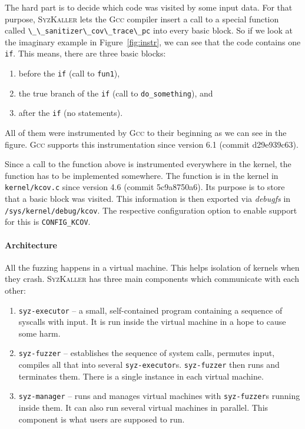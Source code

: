 \documentclass[10pt]{llncs}
\newcommand{\code}[2][]{\lstinline[columns=fullflexible, #1]$#2$}
\newcommand{\gcc}{\textsc{Gcc}\xspace}
\newcommand{\syz}{\textsc{SyzKaller}\xspace}
\begin{document}
The hard part is to decide which code was visited by some input data. For that
purpose, \syz lets the \gcc compiler insert a call to a special function
called \code{\_\_sanitizer\_cov\_trace\_pc} into every basic block.  So if we
look at the imaginary example in Figure~\ref{fig:instr}, we can see that the
code contains one \code{if}.  This means, there are three basic blocks:
\begin{enumerate}
  \item before the \code{if} (call to \code{fun1}),
  \item the true branch of the \code{if} (call to \code{do_something}), and
  \item after the \code{if} (no statements).
\end{enumerate}
All of them were instrumented by \gcc to their beginning as we can see in the
figure. \gcc supports this instrumentation since version 6.1 (commit
d29e939c63).

Since a call to the function above is instrumented everywhere in the kernel,
the function has to be implemented somewhere. The function is in the kernel in
\texttt{kernel/kcov.c} since version 4.6 (commit 5c9a8750a6). Its purpose is
to store that a basic block was visited. This information is then exported via
\textit{debugfs} in \texttt{/sys/kernel/debug/kcov}. The respective
configuration option to enable support for this is \texttt{CONFIG\_KCOV}.

\paragraph{Architecture} All the fuzzing happens in a virtual machine. This
helps isolation of kernels when they crash. \syz has three main components
which communicate with each other:
\begin{enumerate}
  \item \texttt{syz-executor} -- a small, self-contained program containing a
  sequence of syscalls with input. It is run inside the virtual machine in a
  hope to cause some harm.
  \item \texttt{syz-fuzzer} -- establishes the sequence of system calls,
  permutes input, compiles all that into several \texttt{syz-executor}s.
  \texttt{syz-fuzzer} then runs and terminates them. There is a single
  instance in each virtual machine.
  \item \texttt{syz-manager} -- runs and manages virtual machines with
  \texttt{syz-fuzzer}s running inside them. It can also run several virtual
  machines in parallel. This component is what users are supposed to run.
\end{enumerate}
\end{document}
